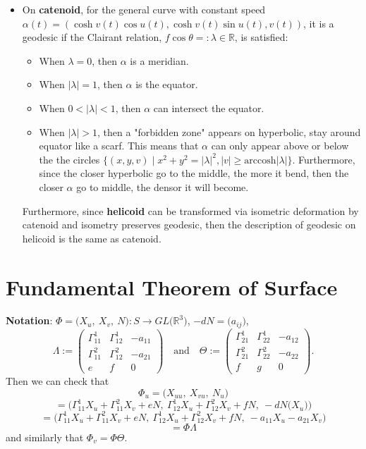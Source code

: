 \begin{itemize}
    \item On \textbf{catenoid}, for the general curve with constant speed $\alpha(t)= (\cosh v(t) \cos u(t), \cosh v(t)\sin u(t), v(t))$, it is a geodesic if the Clairant relation, $f\cos \theta=: \lambda \in \mathbb{R}$, is satisfied:
    \begin{itemize}
        \item When $\lambda=0$, then $\alpha$ is a meridian.
        \item When $|\lambda|=1$, then $\alpha$ is the equator.
        \item When $0<|\lambda|<1$, then $\alpha$ can intersect the equator.
        \item When $|\lambda|>1$, then a "forbidden zone" appears on hyperbolic, stay around equator like a scarf. This means that $\alpha$ can only appear above or below the the circles $\{ (x,y,v) \mid x^2+y^2=|\lambda|^2, |v|\geq \text{arccosh} |\lambda|\}$. Furthermore, since the closer hyperbolic go to the middle, the more it bend, then the closer $\alpha$ go to middle, the densor it will become.
    \end{itemize}
    \noindent Furthermore, since \textbf{helicoid} can be transformed via isometric deformation by catenoid and isometry preserves geodesic, then the description of geodesic on helicoid is the same as catenoid.
\end{itemize}

\section{Fundamental Theorem of Surface}

\noindent\textbf{Notation}: $\Phi = \big(X_u,\ X_v,\ N\big): S\to GL\big(\mathbb{R}^3\big)$, $-dN = \big(a_{ij}\big)$,
\[
\Lambda := \begin{pmatrix}
\Gamma_{11}^1 & \Gamma_{12}^1 & -a_{11}\\
\Gamma_{11}^2 & \Gamma_{12}^2 & -a_{21}\\
e & f & 0
\end{pmatrix}
\quad\text{and}\quad
\Theta := \begin{pmatrix}
\Gamma_{21}^1 & \Gamma_{22}^1 & -a_{12}\\
\Gamma_{21}^2 & \Gamma_{22}^2 & -a_{22}\\
f & g & 0
\end{pmatrix}.
\]
Then we can check that
\[
\Phi_u = \big(X_{uu},\ X_{vu},\ N_u\big)
\]
\[
= \Big(\Gamma_{11}^1X_u + \Gamma_{11}^2X_v + eN,\ \Gamma_{12}^1X_u + \Gamma_{12}^2X_v + fN,\ -dN\big(X_u\big)\Big)
\]
\[
= \Big(\Gamma_{11}^1X_u + \Gamma_{11}^2X_v + eN,\ \Gamma_{12}^1X_u + \Gamma_{12}^2X_v + fN,\ -a_{11}X_u - a_{21}X_v\Big)
\]
\[
= \Phi\Lambda
\]
and similarly that $\Phi_v = \Phi\Theta$.

